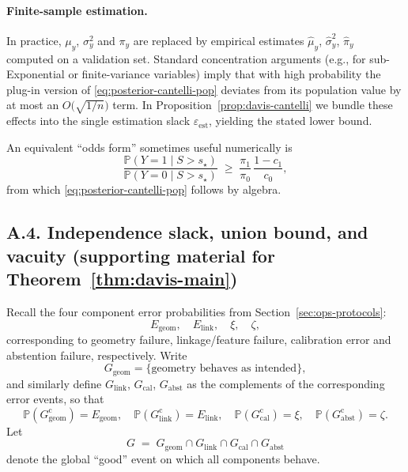 \documentclass[11pt]{article}
\theoremstyle{remark}
\theoremstyle{plain}
\begin{document}
\paragraph{Finite-sample estimation.}
In practice, $\mu_y$, $\sigma_y^2$ and $\pi_y$ are replaced by empirical estimates
$\hat\mu_y$, $\hat\sigma_y^2$, $\hat\pi_y$ computed on a validation set. Standard concentration
arguments (e.g., for sub-Exponential or finite-variance variables) imply that with high probability
the plug-in version of \eqref{eq:posterior-cantelli-pop} deviates from its population value by at
most an $O\!\big(\sqrt{1/n}\big)$ term. In Proposition~\ref{prop:davis-cantelli} we bundle these
effects into the single estimation slack $\varepsilon_{\mathrm{est}}$, yielding the stated lower bound.

An equivalent ``odds form'' sometimes useful numerically is
\[
\frac{\mathbb{P}(Y=1\mid S> s_\star)}{\mathbb{P}(Y=0\mid S> s_\star)}
\;\ge\;
\frac{\pi_1}{\pi_0}\,
\frac{1-c_1}{c_0},
\]
from which \eqref{eq:posterior-cantelli-pop} follows by algebra.

\medskip

\subsection*{A.4. Independence slack, union bound, and vacuity (supporting material for Theorem~\ref{thm:davis-main})}

Recall the four component error probabilities from Section~\ref{sec:ops-protocols}:
\[
E_{\mathrm{geom}},\quad
E_{\mathrm{link}},\quad
\xi,\quad
\zeta,
\]
corresponding to geometry failure, linkage/feature failure, calibration error and abstention failure,
respectively.  Write
\[
G_{\mathrm{geom}} = \{ \text{geometry behaves as intended} \},
\]
and similarly define $G_{\mathrm{link}}$, $G_{\mathrm{cal}}$, $G_{\mathrm{abst}}$ as the complements of the
corresponding error events, so that
\[
\mathbb{P}(G_{\mathrm{geom}}^{\mathrm{c}}) = E_{\mathrm{geom}},\quad
\mathbb{P}(G_{\mathrm{link}}^{\mathrm{c}}) = E_{\mathrm{link}},\quad
\mathbb{P}(G_{\mathrm{cal}}^{\mathrm{c}}) = \xi,\quad
\mathbb{P}(G_{\mathrm{abst}}^{\mathrm{c}}) = \zeta.
\]
Let
\[
G \;=\; G_{\mathrm{geom}}\cap G_{\mathrm{link}}\cap G_{\mathrm{cal}}\cap G_{\mathrm{abst}}
\]
denote the global ``good'' event on which all components behave.
\end{document}
